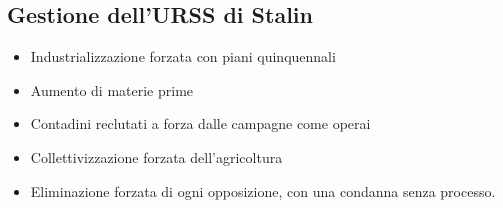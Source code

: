 \documentclass{article}
\begin{document}
\subsection{Gestione dell'URSS di Stalin}
\begin{itemize}
    \item Industrializzazione forzata con piani quinquennali
    \item Aumento di materie prime
    \item Contadini reclutati a forza dalle campagne come operai
    \item Collettivizzazione forzata dell'agricoltura
    \item Eliminazione forzata di ogni opposizione, con una condanna senza processo.
\end{itemize}
\end{document}
